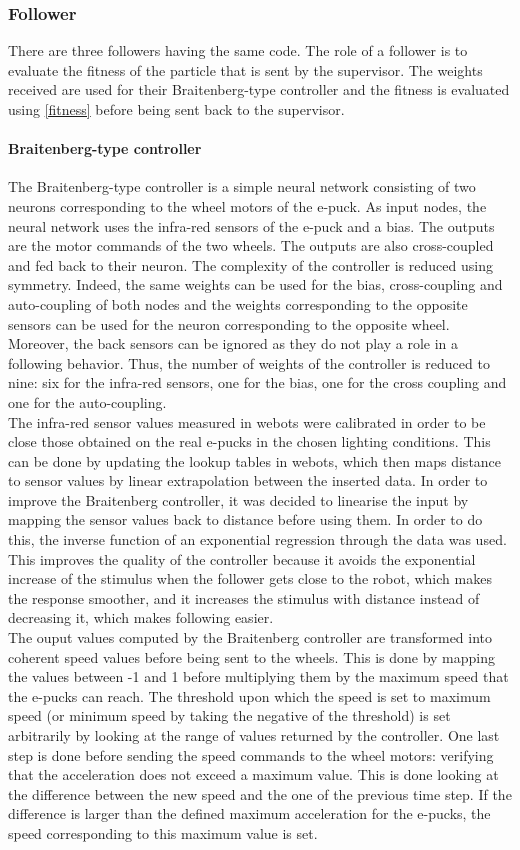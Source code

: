 \documentclass[a4, 10 pt, conference]{ieeeconf}  %
\begin{document}
\subsubsection{Follower}
There are three followers having the same code. The role of a follower is to evaluate the fitness of the particle that is sent by the supervisor. The weights received are used for their Braitenberg-type controller and the fitness is evaluated using \ref{fitness} before being sent back to the supervisor.
\paragraph{Braitenberg-type controller}
The Braitenberg-type controller is a simple neural network consisting of two neurons corresponding to the wheel motors of the e-puck. As input nodes, the neural network uses the infra-red sensors of the e-puck  and a bias. The outputs are the motor commands of the two wheels. The outputs are also cross-coupled and fed back to their neuron. The complexity of the controller is reduced using symmetry. Indeed, the same weights can be used for the bias, cross-coupling and auto-coupling of both nodes and the weights corresponding to the opposite sensors can be used for the neuron corresponding to the opposite wheel. Moreover, the back sensors can be ignored as they do not play a role in a following behavior. Thus, the number of weights of the controller is reduced to nine: six for the infra-red sensors, one for the bias, one for the cross coupling and one for the auto-coupling.\\
The infra-red sensor values measured in webots were calibrated in order to be close those obtained on the real e-pucks in the chosen lighting conditions. This can be done by updating the lookup tables in webots, which then maps distance to sensor values by linear extrapolation between the inserted data. In order to improve the Braitenberg controller, it was decided to linearise the input by mapping the sensor values back to distance before using them. In order to do this, the inverse function of an exponential regression through the data was used. This improves the quality of the controller because it avoids the exponential increase of the stimulus when the follower gets close to the robot, which makes the response smoother, and it increases the stimulus with distance instead of decreasing it, which makes following easier.\\
The ouput values computed by the Braitenberg controller are transformed into coherent speed values before being sent to the wheels. This is done by mapping the values between -1 and 1 before multiplying them by the maximum speed that the e-pucks can reach. The threshold upon which the speed is set to maximum speed (or minimum speed by taking the negative of the threshold) is set arbitrarily by looking at the range of values returned by the controller.
One last step is done before sending the speed commands to the wheel motors: verifying that the acceleration does not exceed a maximum value. This is done looking at the difference between the new speed and the one of the previous time step. If the difference is larger than the defined maximum acceleration for the e-pucks, the speed corresponding to this maximum value is set.
\end{document}
